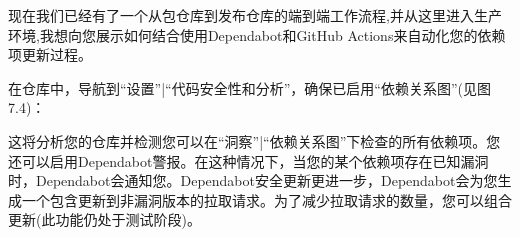 
现在我们已经有了一个从包仓库到发布仓库的端到端工作流程,并从这里进入生产环境,我想向您展示如何结合使用Dependabot和GitHub Actions来自动化您的依赖项更新过程。


在仓库中，导航到“设置”|“代码安全性和分析”，确保已启用“依赖关系图”(见图7.4)：


这将分析您的仓库并检测您可以在“洞察”|“依赖关系图”下检查的所有依赖项。您还可以启用Dependabot警报。在这种情况下，当您的某个依赖项存在已知漏洞时，Dependabot会通知您。Dependabot安全更新更进一步，Dependabot会为您生成一个包含更新到非漏洞版本的拉取请求。为了减少拉取请求的数量，您可以组合更新(此功能仍处于测试阶段)。


